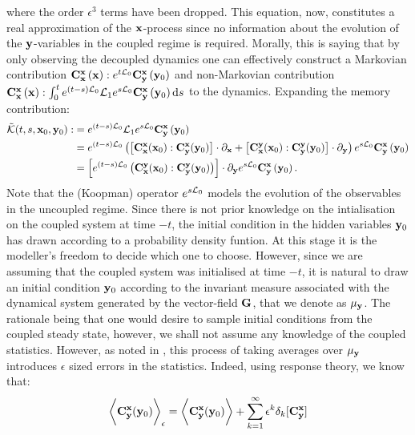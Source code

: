 \documentclass[12pt]{article}
\begin{document}
where the order $\epsilon ^3$ terms have been dropped. This equation, now, constitutes a real approximation of the $\mathbf{x}$-process since no information about the evolution of the $\mathbf{y}$-variables in the coupled regime is required. Morally, this is saying that by only observing the decoupled dynamics one can effectively construct a Markovian contribution $\mathbf{C}_{\mathbf{x}}^{\mathbf{x}}\left(\mathbf{x} \right):e^{t\mathcal{L}_0}\mathbf{C}_{\mathbf{y}}^{\mathbf{x}}\left(\mathbf{y}_0 \right)$  and non-Markovian contribution $\mathbf{C}_{\mathbf{x}}^{\mathbf{x}}\left(\mathbf{x} \right):\int_{0}^te^{(t-s)\mathcal{L}_0}\mathcal{L}_1e^{s\mathcal{L}_0}\mathbf{C}_{\mathbf{y}}^{\mathbf{x}}\left(\mathbf{y}_0 \right)\mathrm{d} s$ to the dynamics. Expanding the memory contribution:
\begin{align}
\tilde{\mathcal{K}}(t,s,\mathbf{x}_0,\mathbf{y}_0):&=e^{(t-s)\mathcal{L}_0}\mathcal{L}_1e^{s\mathcal{L}_0}\mathbf{C}_{\mathbf{y}}^{\mathbf{x}}\left(\mathbf{y}_0 \right) \\ &= e^{(t-s)\mathcal{L}_0}\left(\left[ \mathbf{C}_{\mathbf{x}}^{\mathbf{x}}(\mathbf{x}_0):\mathbf{C}_{\mathbf{y}}^{\mathbf{x}}(\mathbf{y}_0) \right]\cdot \partial _{\mathbf{x}} + \left[\mathbf{C}_{\mathbf{x}}^{\mathbf{y}}(\mathbf{x}_0):\mathbf{C}_{\mathbf{y}}^{\mathbf{y}}(\mathbf{y}_0)  \right]\cdot \partial _{\mathbf{y}}\right)e^{s\mathcal{L}_0}\mathbf{C}_{\mathbf{y}}^{\mathbf{x}}\left(\mathbf{y}_0 \right)\\ &= \left[e^{(t-s)\mathcal{L}_0} \left(\mathbf{C}_{\mathbf{x}}^{\mathbf{y}}(\mathbf{x}_0):\mathbf{C}_{\mathbf{y}}^{\mathbf{y}}(\mathbf{y}_0)  \right)\right]\cdot \partial _{\mathbf{y}}e^{s\mathcal{L}_0}\mathbf{C}_{\mathbf{y}}^{\mathbf{x}}\left(\mathbf{y}_0 \right).
\end{align}
Note that the (Koopman) operator $e^{s\mathcal{L}_0}$ models the evolution of the observables in the uncoupled regime. Since there is not prior knowledge on the intialisation on the coupled system at time $-t$, the initial condition in the hidden variables $\mathbf{y}_0$ has drawn according to a probability density funtion. At this stage it is the modeller's freedom to decide which one to choose. However, since we are assuming that the coupled system was initialised at time $-t$, it is natural to draw an initial condition $\mathbf{y}_0$ according to the invariant measure associated with the dynamical system generated by the vector-field $\mathbf{G}$, that we denote as $\mu_{\mathbf{y}}$. The rationale being that one would desire to sample initial conditions from the coupled steady state, however, we shall not assume any knowledge of the coupled statistics. However, as noted in \cite{wouters2013}, this process of taking averages over $\mu_{\mathbf{y}}$ introduces $\epsilon$ sized errors in the statistics. Indeed, using response theory, we know that:
\begin{equation}
	\bigg\langle  \mathbf{C}_{\mathbf{y}}^{\mathbf{x}}(\mathbf{y}_0) \bigg \rangle_{\epsilon} = \bigg\langle  \mathbf{C}_{\mathbf{y}}^{\mathbf{x}}(\mathbf{y}_0) \bigg \rangle + \sum_{k=1}^{\infty}\epsilon ^{k}\delta_k [\mathbf{C}^{\mathbf{x}}_{\mathbf{y}}]
\end{equation}
\end{document}
